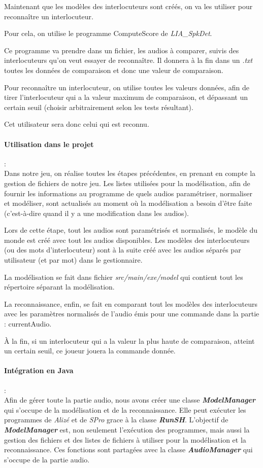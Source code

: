 Maintenant que les modèles des interlocuteurs sont créés, on va les utiliser pour reconnaître un interlocuteur.

Pour cela, on utilise le programme ComputeScore de \textit{LIA\_SpkDet}.

Ce programme va prendre dans un fichier, les audios à comparer, suivis des interlocuteurs qu'on veut essayer de reconnaître. Il donnera à la fin dans un \textit{.txt} toutes les données de comparaison et donc une valeur de comparaison.

Pour reconnaître un interlocuteur, on utilise toutes les valeurs données, afin de tirer l'interlocuteur qui a la valeur maximum de comparaison, et dépassant
un certain seuil (choisir arbitrairement selon les tests résultant).

Cet utilisateur sera donc celui qui est reconnu.


\paragraph*{Utilisation dans le projet} : \\
Dans notre jeu, on réalise toutes les étapes précédentes, en prenant en compte la gestion de fichiers de notre jeu. Les listes utilisées pour la modélisation,
afin de fournir les informations au programme de quels audios paramétriser, normaliser et modéliser, sont actualisés au moment où la modélisation a besoin
d'être faite (c'est-à-dire quand il y a une modification dans les audios).

Lors de cette étape, tout les audios sont paramétrisés et normalisés, le modèle du monde est créé avec tout les audios disponibles.
Les modèles des interlocuteurs (ou des mots d'interlocuteur) sont à la suite créé avec les audios séparés par utilisateur (et par mot) dans le gestionnaire.

La modélisation se fait dans fichier \textit{ src/main/exe/model} qui contient tout les répertoire séparant la modélisation.

La reconnaissance, enfin, se fait en comparant tout les modèles des interlocuteurs avec les paramètres normalisés de l'audio émis pour une commande dans la partie : currentAudio.

À la fin, si un interlocuteur qui a la valeur la plus haute de comparaison, atteint un certain seuil, ce joueur jouera la commande donnée.


\paragraph*{Intégration en Java} : \\
Afin de gérer toute la partie audio, nous avons créer une classe \textbf{\textit{ModelManager}} qui s'occupe de la modélisation et de la reconnaissance. Elle
peut exécuter les programmes de \textit{Alizé} et de \textit{SPro} grace à la classe \textbf{\textit{RunSH}}. L'objectif de \textbf{\textit{ModelManager}}
est, non seulement l'exécution des programmes, mais aussi la gestion des fichiers et des listes de fichiers à utiliser pour la modélisation et la
reconnaissance. 
Ces fonctions sont partagées avec la classe \textbf{\textit{AudioManager}} qui s'occupe de la partie audio.

